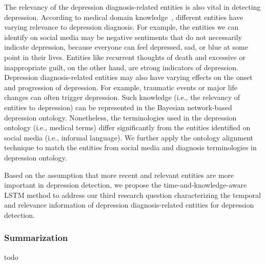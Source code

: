 The relevancy of the depression diagnosis-related entities is also vital in detecting depression. According to medical domain knowledge~, different entities have varying relevance to depression diagnosis. For example, the entities we can identify on social media may be negative sentiments that do not necessarily indicate depression, because everyone can feel depressed, sad, or blue at some point in their lives. Entities like recurrent thoughts of death and excessive or inappropriate guilt, on the other hand, are strong indicators of depression. Depression diagnosis-related entities may also have varying effects on the onset and progression of depression. For example, traumatic events or major life changes can often trigger depression. Such knowledge (i.e., the relevancy of entities to depression) can be represented in the Bayesian network-based depression ontology. Nonetheless, the terminologies used in the depression ontology (i.e., medical terms) differ significantly from the entities identified on social media (i.e., informal language). We further apply the ontology alignment technique to match the entities from social media and diagnosis terminologies in depression ontology.

Based on the assumption that more recent and relevant entities are more important in depression detection, we propose the time-and-knowledge-aware LSTM method to address our third research question \textendash characterizing the temporal and relevance information of depression diagnosis-related entities for depression detection.


\subsubsection{Summarization}\label{sec:related:four:summary}

todo
